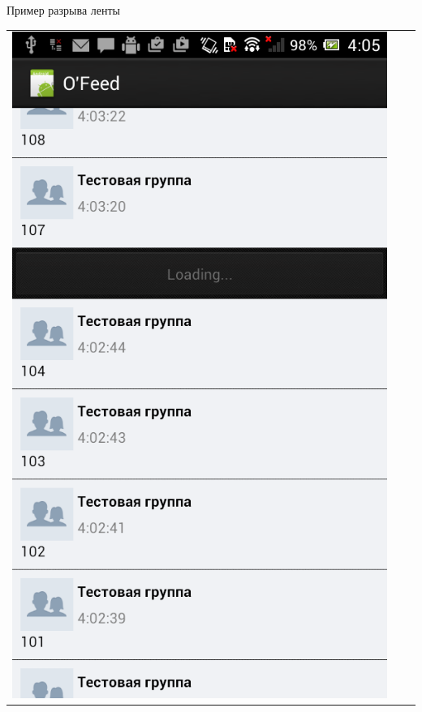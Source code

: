 \documentclass[utf8,xcolor=table]{beamer}
\begin{document}
\begin{frame}[t]{Пример разрыва ленты}
\begin{center}
\begin{tabular}{ccc}
			\includegraphics[scale=0.18]{b.png}
			&

\end{tabular}
\end{center}
\end{frame}
\end{document}
